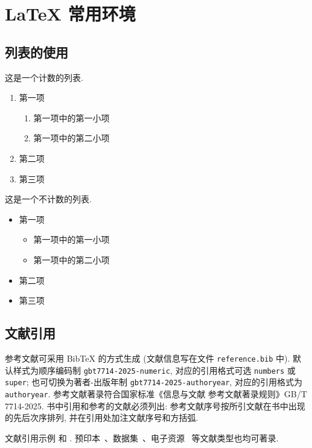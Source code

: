 

\chapter{LaTeX 常用环境}

\section{列表的使用}

这是一个计数的列表.
\begin{enumerate}%
	\item 第一项
		\begin{enumerate}
			\item 第一项中的第一小项
			\item 第一项中的第二小项
		\end{enumerate}
	\item 第二项
	\item 第三项
\end{enumerate}

这是一个不计数的列表.
\begin{itemize}%
	\item 第一项
	\begin{itemize}
		\item 第一项中的第一小项
		\item 第一项中的第二小项
	\end{itemize}
	\item 第二项
	\item 第三项
\end{itemize}


\section{文献引用}

参考文献可采用 BibTeX 的方式生成 (文献信息写在文件 \texttt{reference.bib} 中). 默认样式为顺序编码制 \texttt{gbt7714-2025-numeric}, 对应的引用格式可选 \texttt{numbers} 或 \texttt{super}; 也可切换为著者-出版年制 \texttt{gbt7714-2025-authoryear}, 对应的引用格式为 \texttt{authoryear}. 参考文献著录符合国家标准《信息与文献 参考文献著录规则》GB/T 7714-2025. 书中引用和参考的文献必须列出: 参考文献序号按所引文献在书中出现的先后次序排列, 并在引用处加注文献序号和方括弧.

文献引用示例 \cite[定理~1.1]{LiLiu1997} 和 \cite{Adams2003,Shen1994}. 预印本~\cite{BaoCai2012}、数据集~\cite{Zhou2023}、电子资源~\cite{DLMF} 等文献类型也均可著录.


